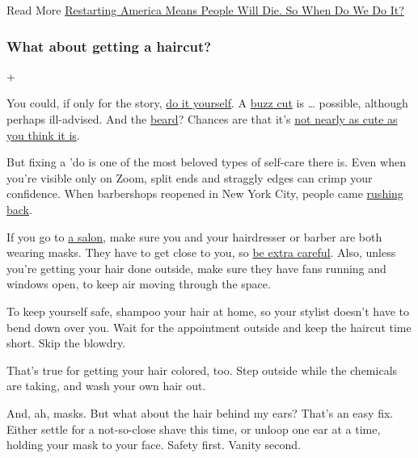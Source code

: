  Read More
\href{https://www.nytimes.com/2020/04/10/magazine/coronavirus-economy-debate.html}{Restarting
America Means People Will Die. So When Do We Do It?}

\hypertarget{what-about-getting-a-haircut}{%
\subsubsection{What about getting a
haircut?}\label{what-about-getting-a-haircut}}

+

You could, if only for the story,
\href{https://www.nytimes.com/wirecutter/reviews/how-to-cut-your-own-hair/}{do
it yourself}. A
\href{https://www.nytimes.com/2020/04/15/style/self-care/buzz-cut-your-own-hair.html}{buzz
cut} is \ldots{} possible, although perhaps ill-advised. And the
\href{https://www.nytimes.com/2020/04/21/smarter-living/maybe-consider-shaving-that-pandemic-beard.html}{beard}?
Chances are that it's
\href{https://www.nytimes.com/2020/07/03/at-home/coronavirus-beards.html}{not
nearly as cute as you think it is}.

But fixing a 'do is one of the most beloved types of self-care there is.
Even when you're visible only on Zoom, split ends and straggly edges can
crimp your confidence. When barbershops reopened in New York City,
people came
\href{https://www.nytimes.com/2020/06/25/nyregion/nyc-barber-shops-coronavirus.html}{rushing
back}.

If you go to
\href{https://www.nytimes.com/2020/06/12/fashion/haircut-salon-reopening.html}{a
salon}, make sure you and your hairdresser or barber are both wearing
masks. They have to get close to you, so
\href{https://www.nytimes.com/2020/05/06/style/coronavirus-haircuts-barbers.html}{be
extra careful}. Also, unless you're getting your hair done outside, make
sure they have fans running and windows open, to keep air moving through
the space.

To keep yourself safe, shampoo your hair at home, so your stylist
doesn't have to bend down over you. Wait for the appointment outside and
keep the haircut time short. Skip the blowdry.

That's true for getting your hair colored, too. Step outside while the
chemicals are taking, and wash your own hair out.

And, ah, masks. But what about the hair behind my ears? That's an easy
fix. Either settle for a not-so-close shave this time, or unloop one ear
at a time, holding your mask to your face. Safety first. Vanity second.

